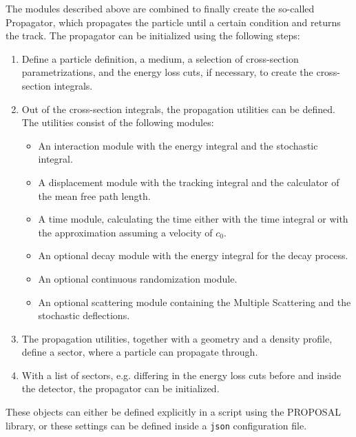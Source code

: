 The modules described above are combined to finally create the so-called Propagator, which propagates the particle until a certain condition and returns the track.
The propagator can be initialized using the following steps:
\begin{enumerate}
    \item Define a particle definition, a medium, a selection of cross-section parametrizations, and the energy loss cuts, if necessary, to create the cross-section integrals.
    \item Out of the cross-section integrals, the propagation utilities can be defined. The utilities consist of the following modules:
    \begin{itemize}
        \item An interaction module with the energy integral and the stochastic integral.
        \item A displacement module with the tracking integral and the calculator of the mean free path length.
        \item A time module, calculating the time either with the time integral or with the approximation assuming a velocity of $c_0$.
        \item An optional decay module with the energy integral for the decay process.
        \item An optional continuous randomization module.
        \item An optional scattering module containing the Multiple Scattering and the stochastic deflections.
    \end{itemize}
    \item The propagation utilities, together with a geometry and a density profile, define a sector, where a particle can propagate through.
    \item With a list of sectors, e.g. differing in the energy loss cuts before and inside the detector, the propagator can be initialized.
\end{enumerate}
These objects can either be defined explicitly in a script using the PROPOSAL library, or these settings can be defined inside a \texttt{json} configuration file.

